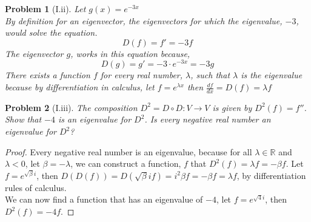 \documentclass[12pt]{article}   %
\newcommand{\R}{\mathbb{R}} %
\newtheorem{problem}{Problem}
\begin{document}
\begin{problem}[I.ii]
Let $g(x)=e^{-3x}$\\
By definition for an eigenvector, the eigenvectors for which the eigenvalue, $-3$, would solve the equation.
\[D(f)=f'=-3f\]
The eigenvector $g$, works in this equation because,
\[D(g)=g'=-3\cdot e^{-3x}=-3g\]
There exists a function $f$ for every real number, $\lambda$, such that $\lambda$ is the eigenvalue because by differentiation in calculus, let $f=e^{\lambda x}$ then $\frac{df}{dx}=D(f)=\lambda f$
\end{problem}
\begin{problem}[I.iii]
The composition $D^2 = D\circ D: V \to V$ is given by $D^2(f) = f''$. Show that $-4$ is an
eigenvalue for $D^2$. Is every negative real number an eigenvalue for $D^2$?
\end{problem}
\begin{proof}
Every negative real number is an eigenvalue, because for all $\lambda \in \R$ and $\lambda < 0$, let $\beta = -\lambda$, we can construct a function, $f$ that $D^2(f)=\lambda f=-\beta f$. Let $f=e^{\sqrt{\beta}i}$, then $D(D(f))=D(\sqrt{\beta}if)=i^2 \beta f=-\beta f=\lambda f$, by differentiation rules of calculus.\\
We can now find a function that has an eigenvalue of $-4$, let $f=e^{\sqrt{4}i}$, then $D^2(f)=-4f$.
\end{proof}
\end{document}
